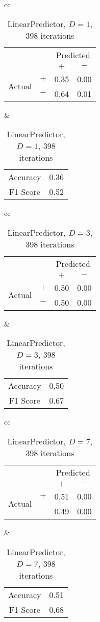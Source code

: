 \documentclass[twocolumn,10pt]{asme2ej}
\begin{document}
\begin{table}
  \begin{tabular}{cc}
    \begin{tabular}{cc|cc}
      & & \multicolumn{2}{c}{Predicted} \\
      & & $+ $ & $-$ \\
      \hline
      \multirow{2}{*}{Actual}
      & $+$ & 0.35 & 0.00 \\
      & $-$ & 0.64 & 0.01 \\
      \hline
    \end{tabular}
    &
    \begin{tabular}{cc}
      Accuracy & 0.36 \\
      F1 Score & 0.52 \\
    \end{tabular}
  \end{tabular}
  \caption{LinearPredictor, $D=1$, 398 iterations}
  \label{pred-perf-LinearPredictor-1-398}
\end{table}


\begin{table}
  \begin{tabular}{cc}
    \begin{tabular}{cc|cc}
      & & \multicolumn{2}{c}{Predicted} \\
      & & $+ $ & $-$ \\
      \hline
      \multirow{2}{*}{Actual}
      & $+$ & 0.50 & 0.00 \\
      & $-$ & 0.50 & 0.00 \\
      \hline
    \end{tabular}
    &
    \begin{tabular}{cc}
      Accuracy & 0.50 \\
      F1 Score & 0.67 \\
    \end{tabular}
  \end{tabular}
  \caption{LinearPredictor, $D=3$, 398 iterations}
  \label{pred-perf-LinearPredictor-3-398}
\end{table}


\begin{table}
  \begin{tabular}{cc}
    \begin{tabular}{cc|cc}
      & & \multicolumn{2}{c}{Predicted} \\
      & & $+ $ & $-$ \\
      \hline
      \multirow{2}{*}{Actual}
      & $+$ & 0.51 & 0.00 \\
      & $-$ & 0.49 & 0.00 \\
      \hline
    \end{tabular}
    &
    \begin{tabular}{cc}
      Accuracy & 0.51 \\
      F1 Score & 0.68 \\
    \end{tabular}
  \end{tabular}
  \caption{LinearPredictor, $D=7$, 398 iterations}
  \label{pred-perf-LinearPredictor-7-398}
\end{table}
\end{document}
